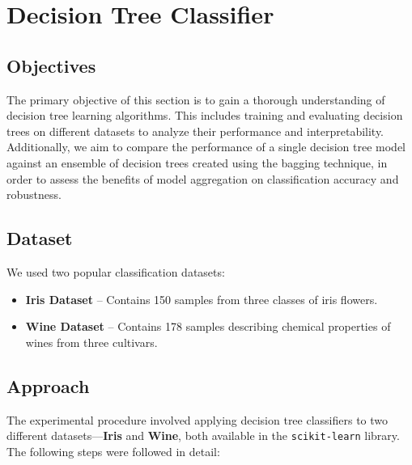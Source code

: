 \documentclass[a4paper,12pt]{article}
\begin{document}
\newpage
\section{Decision Tree Classifier}

\subsection{Objectives}

The primary objective of this section is to gain a thorough understanding of decision tree learning algorithms. This includes training and evaluating decision trees on different datasets to analyze their performance and interpretability. Additionally, we aim to compare the performance of a single decision tree model against an ensemble of decision trees created using the bagging technique, in order to assess the benefits of model aggregation on classification accuracy and robustness.


\subsection{Dataset}
We used two popular classification datasets:
\begin{itemize}
    \item \textbf{Iris Dataset} – Contains 150 samples from three classes of iris flowers.
    \item \textbf{Wine Dataset} – Contains 178 samples describing chemical properties of wines from three cultivars.
\end{itemize}



\subsection{Approach}

The experimental procedure involved applying decision tree classifiers to two different datasets—\textbf{Iris} and \textbf{Wine}, both available in the \texttt{scikit-learn} library. The following steps were followed in detail:
\end{document}
